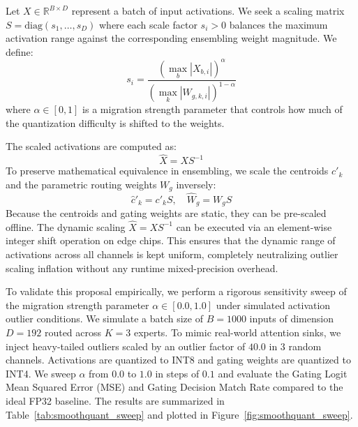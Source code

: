 \documentclass{article}
\theoremstyle{plain}
\theoremstyle{definition}
\theoremstyle{remark}
\begin{document}
Let $X \in \mathbb{R}^{B \times D}$ represent a batch of input activations. We seek a scaling matrix $S = \text{diag}(s_1, \dots, s_D)$ where each scale factor $s_i > 0$ balances the maximum activation range against the corresponding ensembling weight magnitude. We define:
\begin{equation}
    s_i = \frac{(\max_{b} |X_{b, i}|)^\alpha}{(\max_{k} |W_{g, k, i}|)^{1-\alpha}}
\end{equation}
where $\alpha \in [0, 1]$ is a migration strength parameter that controls how much of the quantization difficulty is shifted to the weights. 

The scaled activations are computed as:
\begin{equation}
    \hat{X} = X S^{-1}
\end{equation}
To preserve mathematical equivalence in ensembling, we scale the centroids $c'_k$ and the parametric routing weights $W_g$ inversely:
\begin{equation}
    \hat{c}'_k = c'_k S, \quad \hat{W}_g = W_g S
\end{equation}
Because the centroids and gating weights are static, they can be pre-scaled offline. The dynamic scaling $\hat{X} = X S^{-1}$ can be executed via an element-wise integer shift operation on edge chips. This ensures that the dynamic range of activations across all channels is kept uniform, completely neutralizing outlier scaling inflation without any runtime mixed-precision overhead.

To validate this proposal empirically, we perform a rigorous sensitivity sweep of the migration strength parameter $\alpha \in [0.0, 1.0]$ under simulated activation outlier conditions. We simulate a batch size of $B=1000$ inputs of dimension $D=192$ routed across $K=3$ experts. To mimic real-world attention sinks, we inject heavy-tailed outliers scaled by an outlier factor of $40.0$ in 3 random channels. Activations are quantized to INT8 and gating weights are quantized to INT4. We sweep $\alpha$ from $0.0$ to $1.0$ in steps of $0.1$ and evaluate the Gating Logit Mean Squared Error (MSE) and Gating Decision Match Rate compared to the ideal FP32 baseline. The results are summarized in Table~\ref{tab:smoothquant_sweep} and plotted in Figure~\ref{fig:smoothquant_sweep}.
\end{document}
